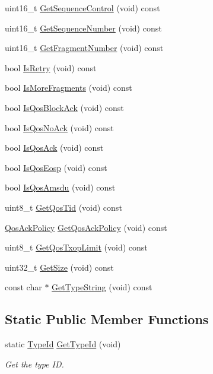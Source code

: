 \begin{DoxyCompactItemize}
\item 
uint16\+\_\+t \hyperlink{classns3_1_1WifiMacHeader_a9d6c7e809271331e5271d29e58800593}{Get\+Sequence\+Control} (void) const 
\item 
uint16\+\_\+t \hyperlink{classns3_1_1WifiMacHeader_aa202a29c2d6aebe9b3d589e58cbd17bb}{Get\+Sequence\+Number} (void) const 
\item 
uint16\+\_\+t \hyperlink{classns3_1_1WifiMacHeader_aae43c0ba5ec30e308c7c975296046da2}{Get\+Fragment\+Number} (void) const 
\item 
bool \hyperlink{classns3_1_1WifiMacHeader_af8da93935be1b55289003fbb29f81d64}{Is\+Retry} (void) const 
\item 
bool \hyperlink{classns3_1_1WifiMacHeader_a02f242a1d40c268d47781f7d2b0a71be}{Is\+More\+Fragments} (void) const 
\item 
bool \hyperlink{classns3_1_1WifiMacHeader_aaa152fcd66b795ee978cf48264b2c57e}{Is\+Qos\+Block\+Ack} (void) const 
\item 
bool \hyperlink{classns3_1_1WifiMacHeader_a4c8e3e15189f79c3ff3b87e3f91f8653}{Is\+Qos\+No\+Ack} (void) const 
\item 
bool \hyperlink{classns3_1_1WifiMacHeader_ab592757c3e5dd3f78b65e37a46921184}{Is\+Qos\+Ack} (void) const 
\item 
bool \hyperlink{classns3_1_1WifiMacHeader_ac7707eb8397e529e23f5cadd7daddbaa}{Is\+Qos\+Eosp} (void) const 
\item 
bool \hyperlink{classns3_1_1WifiMacHeader_ae640dc1677df83cba71b9ad61e2931b4}{Is\+Qos\+Amsdu} (void) const 
\item 
uint8\+\_\+t \hyperlink{classns3_1_1WifiMacHeader_a2b3faf14ac0d16a29729a2336afd7662}{Get\+Qos\+Tid} (void) const 
\item 
\hyperlink{classns3_1_1WifiMacHeader_ae3a382482f357972019f5e1b3162adc4}{Qos\+Ack\+Policy} \hyperlink{classns3_1_1WifiMacHeader_afc259bd254f9a37fe3d54c4acbca1c98}{Get\+Qos\+Ack\+Policy} (void) const 
\item 
uint8\+\_\+t \hyperlink{classns3_1_1WifiMacHeader_aa16dba2197f86770c8c35da9c06ce85d}{Get\+Qos\+Txop\+Limit} (void) const 
\item 
uint32\+\_\+t \hyperlink{classns3_1_1WifiMacHeader_ac9bc562c4b257b464c96cfdf7d7becdf}{Get\+Size} (void) const 
\item 
const char $\ast$ \hyperlink{classns3_1_1WifiMacHeader_ab41f17fe4a357d0cef9ae6de86bc7bf3}{Get\+Type\+String} (void) const 
\end{DoxyCompactItemize}
\subsection*{Static Public Member Functions}
\begin{DoxyCompactItemize}
\item 
static \hyperlink{classns3_1_1TypeId}{Type\+Id} \hyperlink{classns3_1_1WifiMacHeader_a4d077efbc1d7a0cff7066241b99926ab}{Get\+Type\+Id} (void)
\begin{DoxyCompactList}\small\item\em Get the type ID. \end{DoxyCompactList}\end{DoxyCompactItemize}
